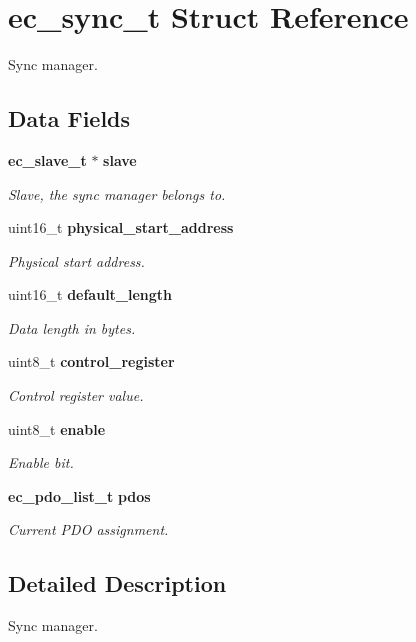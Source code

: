 \section{ec\-\_\-sync\-\_\-t Struct Reference}
\label{structec__sync__t}


Sync manager.  


\subsection*{Data Fields}
\begin{DoxyCompactItemize}
\item 
{\bf ec\-\_\-slave\-\_\-t} $\ast$ {\bf slave}
\begin{DoxyCompactList}\small\item\em Slave, the sync manager belongs to. \end{DoxyCompactList}\item 
uint16\-\_\-t {\bf physical\-\_\-start\-\_\-address}
\begin{DoxyCompactList}\small\item\em Physical start address. \end{DoxyCompactList}\item 
uint16\-\_\-t {\bf default\-\_\-length}
\begin{DoxyCompactList}\small\item\em Data length in bytes. \end{DoxyCompactList}\item 
uint8\-\_\-t {\bf control\-\_\-register}
\begin{DoxyCompactList}\small\item\em Control register value. \end{DoxyCompactList}\item 
uint8\-\_\-t {\bf enable}
\begin{DoxyCompactList}\small\item\em Enable bit. \end{DoxyCompactList}\item 
{\bf ec\-\_\-pdo\-\_\-list\-\_\-t} {\bf pdos}
\begin{DoxyCompactList}\small\item\em Current P\-D\-O assignment. \end{DoxyCompactList}\end{DoxyCompactItemize}


\subsection{Detailed Description}
Sync manager. 

